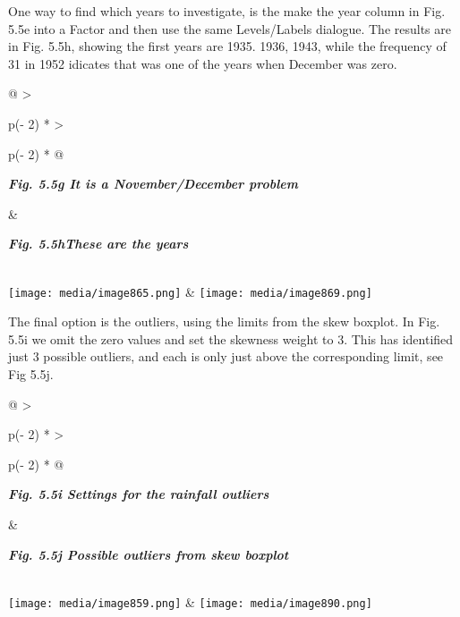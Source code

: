 \documentclass[
  letterpaper,
  DIV=11,
  numbers=noendperiod]{scrreprt}
\begin{document}
One way to find which years to investigate, is the make the year column
in Fig. 5.5e into a Factor and then use the same Levels/Labels dialogue.
The results are in Fig. 5.5h, showing the first years are 1935. 1936,
1943, while the frequency of 31 in 1952 idicates that was one of the
years when December was zero.

\begin{longtable}[]{@{}
  >{\raggedright\arraybackslash}p{(\columnwidth - 2\tabcolsep) * }
  >{\raggedright\arraybackslash}p{(\columnwidth - 2\tabcolsep) * }@{}}
\toprule\noalign{}
\begin{minipage}[b]{\linewidth}\raggedright
\textbf{\emph{Fig. 5.5g It is a November/December problem}}
\end{minipage} & \begin{minipage}[b]{\linewidth}\raggedright
\textbf{\emph{Fig. 5.5hThese are the years}}
\end{minipage} \\
\midrule\noalign{}
\endhead
\bottomrule\noalign{}
\endlastfoot
\texttt{[image: media/image865.png]} &
\texttt{[image: media/image869.png]} \\
\end{longtable}

The final option is the outliers, using the limits from the skew
boxplot. In Fig. 5.5i we omit the zero values and set the skewness
weight to 3. This has identified just 3 possible outliers, and each is
only just above the corresponding limit, see Fig 5.5j.

\begin{longtable}[]{@{}
  >{\raggedright\arraybackslash}p{(\columnwidth - 2\tabcolsep) * }
  >{\raggedright\arraybackslash}p{(\columnwidth - 2\tabcolsep) * }@{}}
\toprule\noalign{}
\begin{minipage}[b]{\linewidth}\raggedright
\textbf{\emph{Fig. 5.5i Settings for the rainfall outliers}}
\end{minipage} & \begin{minipage}[b]{\linewidth}\raggedright
\textbf{\emph{Fig. 5.5j Possible outliers from skew boxplot}}
\end{minipage} \\
\midrule\noalign{}
\endhead
\bottomrule\noalign{}
\endlastfoot
\texttt{[image: media/image859.png]} &
\texttt{[image: media/image890.png]} \\
\end{longtable}

\end{document}
